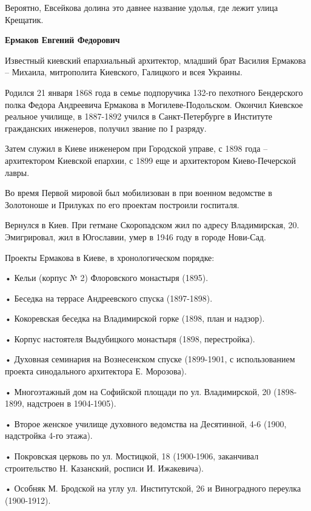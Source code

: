 Вероятно, Евсейкова долина это давнее название удолья, где лежит улица Крещатик.\\

\medskip


\textbf{Ермаков Евгений Федорович} 

Известный киевский епархиальный архитектор, младший брат Василия Ермакова – Михаила, митрополита Киевского, Галицкого и всея Украины.

Родился  21 января 1868 года в семье подпоручика 132-го пехотного Бендерского полка Федора Андреевича Ермакова в Могилеве-Подольском. Окончил Киевское реальное училище, в 1887-1892 учился в Санкт-Петербурге в Институте гражданских инженеров, получил звание по I разряду.

Затем служил в Киеве инженером при Городской управе, с 1898 года – архитектором Киевской епархии, с 1899 еще и архитектором Киево-Печерской лавры.

Во время Первой мировой был мобилизован в при военном ведомстве в Золотоноше и Прилуках по его проектам построили госпиталя.

Вернулся в Киев. При гетмане Скоропадском жил по адресу Владимирская, 20. Эмигрировал, жил в Югославии, умер в 1946 году в городе Нови-Сад.

Проекты Ермакова в Киеве, в хронологическом порядке:

\noindent • Кельи (корпус № 2) Флоровского монастыря (1895).

\noindent • Беседка на террасе Андреевского спуска (1897-1898).

\noindent • Кокоревская беседка на Владимирской горке (1898, план и надзор).

\noindent • Корпус настоятеля Выдубицкого монастыря (1898, перестройка).

\noindent • Духовная семинария на Вознесенском спуске (1899-1901, с использованием проекта синодального архитектора Е. Морозова).

\noindent • Многоэтажный дом на Софийской площади по ул. Владимирской, 20 (1898-1899, надстроен в 1904-1905).

\noindent • Второе женское училище духовного ведомства на Десятинной, 4-6 (1900, надстройка 4-го этажа).

\noindent • Покровская церковь по ул. Мостицкой, 18 (1900-1906, заканчивал строительство Н. Казанский, росписи И. Ижакевича).

\noindent • Особняк М. Бродской на углу ул. Институтской, 26 и Виноградного переулка (1900-1912).

